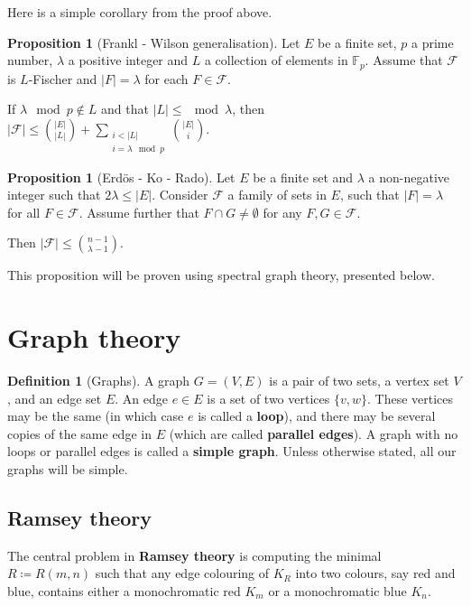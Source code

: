 \documentclass[12pt]{amsart}
\theoremstyle{definition}
\newtheorem{prop}[thm]{Proposition}
\newtheorem{defin}[thm]{Definition}
\newcommand{\F}{\mathbb{F}}
\newcommand{\FF}{\mathcal F}
\begin{document}
Here is a simple corollary from the proof above.

\begin{prop}[Frankl - Wilson generalisation]\label{prop:FWgen}
Let $E$ be a finite set, $p$ a prime number, $\lambda$ a positive integer and $L$ a collection of elements in $\F_p$.
Assume that $\FF$ is $L$-Fischer and $|F| = \lambda $ for each $F \in \FF$.

If $\lambda \mod p\not\in L$ and that $|L| \leq \mod \lambda$, then $|\FF| \leq \binom{|E|}{|L|} + \sum_{\substack{i < |L| \\ i = \lambda \mod p}} \binom{|E|}{i}$.
\end{prop}

\begin{prop}[Erd\"os - Ko - Rado]\label{prop:EKR}
Let $E$ be a finite set and  $\lambda $ a non-negative integer such that $2\lambda \leq |E|$.
Consider $\FF$  a family of sets in $E$, such that $|F| = \lambda $ for all $F \in \FF$.
Assume further that $F\cap G \neq \emptyset $ for any $F, G \in \FF$.

Then $|\FF| \leq \binom{n-1}{\lambda - 1}$.
\end{prop}

This proposition will be proven using spectral graph theory, presented below.



\section{Graph theory}


\begin{defin}[Graphs]
A graph $G = (V, E) $ is a pair of two sets, a vertex set $V$, and an edge set $E$.
An edge $e \in E$ is a set of two vertices $\{v, w\}$.
These vertices may be the same (in which case $e$ is called a \textbf{loop}), and there may be several copies of the same edge in $E$ (which are called \textbf{parallel edges}).
A graph with no loops or parallel edges is called a \textbf{simple graph}.
Unless otherwise stated, all our graphs will be simple.
\end{defin}


\subsection{Ramsey theory}
The central problem in \textbf{Ramsey theory} is computing the minimal $R \coloneqq R(m, n)$ such that any edge colouring of $K_R$ into two colours, say red and blue, contains either a monochromatic red $K_m$ or a monochromatic blue $K_n$.
\end{document}
